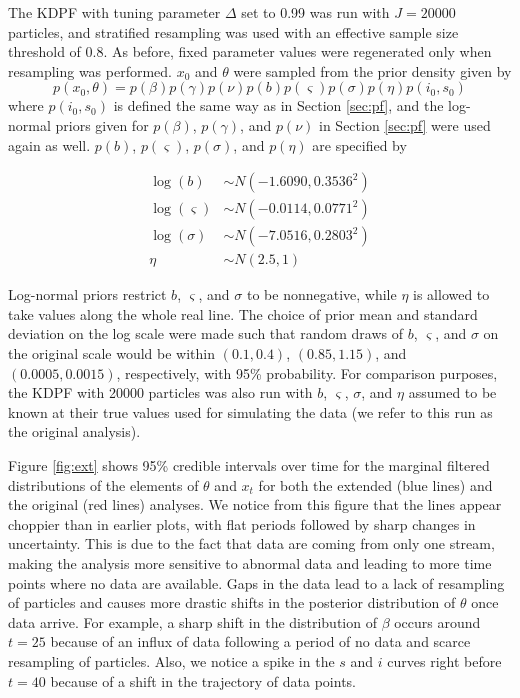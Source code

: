 \documentclass{elsarticle}
\begin{document}
The KDPF with tuning parameter $\Delta$ set to 0.99 was run with $J = 20000$ particles, and stratified resampling was used with an effective sample size threshold of 0.8. As before, fixed parameter values were regenerated only when resampling was performed. $x_0$ and $\theta$ were sampled from the prior density given by
\[ p\left(x_0,\theta\right) = p\left(\beta\right)p\left(\gamma\right)p\left(\nu\right)p\left(b\right)p\left(\varsigma\right)p\left(\sigma\right)p\left(\eta\right)p\left(i_0,s_0\right) \]
\noindent where $p(i_0,s_0)$ is defined the same way as in Section \ref{sec:pf}, and the log-normal priors given for $p(\beta)$, $p(\gamma)$, and $p(\nu)$ in Section \ref{sec:pf} were used again as well. $p(b)$, $p(\varsigma)$, $p(\sigma)$, and $p(\eta)$ are specified by

\begin{align*}
\log\left(b\right) &\sim  N\left(-1.6090, 0.3536^2\right) \\
\log\left(\varsigma\right) &\sim N\left(-0.0114, 0.0771^2\right) \\
\log\left(\sigma\right) &\sim N\left(-7.0516, 0.2803^2\right) \\
\eta &\sim N\left(2.5, 1\right)
\end{align*}

Log-normal priors restrict $b$, $\varsigma$, and $\sigma$ to be nonnegative, while $\eta$ is allowed to take values along the whole real line. The choice of prior mean and standard deviation on the log scale were made such that random draws of $b$, $\varsigma$, and $\sigma$ on the original scale would be within $(0.1, 0.4)$, $(0.85, 1.15)$, and $(0.0005, 0.0015)$, respectively, with 95\% probability. For comparison purposes, the KDPF with 20000 particles was also run with $b$, $\varsigma$, $\sigma$, and $\eta$ assumed to be known at their true values used for simulating the data (we refer to this run as the original analysis).

Figure \ref{fig:ext} shows 95\% credible intervals over time for the marginal filtered distributions of the elements of $\theta$ and $x_t$ for both the extended (blue lines) and the original (red lines) analyses. We notice from this figure that the lines appear choppier than in earlier plots, with flat periods followed by sharp changes in uncertainty. This is due to the fact that data are coming from only one stream, making the analysis more sensitive to abnormal data and leading to more time points where no data are available. Gaps in the data lead to a lack of resampling of particles and causes more drastic shifts in the posterior distribution of $\theta$ once data arrive. For example, a sharp shift in the distribution of $\beta$ occurs around $t = 25$ because of an influx of data following a period of no data and scarce resampling of particles. Also, we notice a spike in the $s$ and $i$ curves right before $t = 40$ because of a shift in the trajectory of data points.
\end{document}
